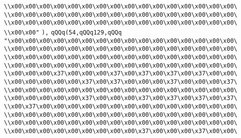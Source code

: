 \verb|\\x00\x00\x00\x00\x00\x00\x00\x00\x00\x00\x00\x00\x00\x00\x00\x00\|\newline
\verb|\\x00\x00\x00\x00\x00\x00\x00\x00\x00\x00\x00\x00\x00\x00\x00\x00\|\newline
\verb|\\x00\x00\x00\x00\x00\x00\x00\x00\x00\x00\x00\x00\x00\x00\x00\x00\|\newline
\verb|\\x00\x00"|\newline
\verb|),|\newline
\verb|qQQq(54,qQQq129,qQQq|\newline
\verb|"\x00\x00\x00\x00\x00\x00\x00\x00\x00\x00\x00\x00\x00\x00\x00\x00\|\newline
\verb|\\x00\x00\x00\x00\x00\x00\x00\x00\x00\x00\x00\x00\x00\x00\x00\x00\|\newline
\verb|\\x00\x00\x00\x00\x00\x00\x00\x00\x00\x00\x00\x00\x00\x00\x00\x00\|\newline
\verb|\\x00\x00\x00\x00\x00\x00\x00\x00\x00\x00\x00\x00\x00\x00\x00\x00\|\newline
\verb|\\x00\x00\x00\x37\x00\x00\x00\x37\x00\x37\x00\x37\x00\x37\x00\x00\|\newline
\verb|\\x00\x00\x00\x00\x00\x37\x00\x37\x00\x00\x00\x37\x00\x00\x00\x37\|\newline
\verb|\\x00\x00\x00\x00\x00\x00\x00\x00\x00\x00\x00\x00\x00\x00\x00\x00\|\newline
\verb|\\x00\x00\x00\x00\x00\x37\x00\x00\x00\x37\x00\x37\x00\x37\x00\x37\|\newline
\verb|\\x00\x37\x00\x00\x00\x00\x00\x00\x00\x00\x00\x00\x00\x00\x00\x00\|\newline
\verb|\\x00\x00\x00\x00\x00\x00\x00\x00\x00\x00\x00\x00\x00\x00\x00\x00\|\newline
\verb|\\x00\x00\x00\x00\x00\x00\x00\x00\x00\x00\x00\x00\x00\x00\x00\x00\|\newline
\verb|\\x00\x00\x00\x00\x00\x00\x00\x00\x00\x37\x00\x00\x00\x37\x00\x00\|\newline
